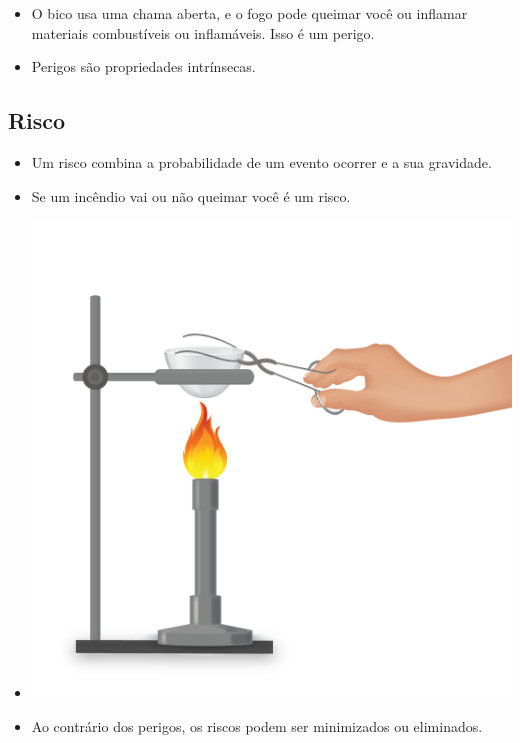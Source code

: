 \documentclass[
  letterpaper,
  DIV=11,
  numbers=noendperiod]{scrartcl}
\providecommand{\tightlist}{%
  \setlength{\itemsep}{0pt}\setlength{\parskip}{0pt}}\usepackage{longtable,booktabs,array}
\begin{document}
\begin{itemize}
\tightlist
\item
  O bico usa uma chama aberta, e o fogo pode queimar você ou inflamar
  materiais combustíveis ou inflamáveis. Isso é um perigo.
\item
  Perigos são propriedades intrínsecas.
\end{itemize}

\subsection{Risco}\label{risco}

\begin{itemize}
\tightlist
\item
  Um risco combina a probabilidade de um evento ocorrer e a sua
  gravidade.
\item
  Se um incêndio vai ou não queimar você é um risco.
\item
  \includegraphics[width=5.20833in,height=\textheight,keepaspectratio]{imagens/image_2.13ea1c26.png}
\end{itemize}

\begin{itemize}
\tightlist
\item
  Ao contrário dos perigos, os riscos podem ser minimizados ou
  eliminados.
\end{itemize}
\end{document}
